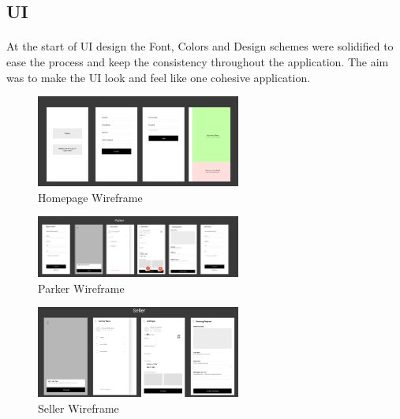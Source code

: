                 \subsection{UI}
                \paragraph*{}
                    At the start of UI design the Font, Colors and Design schemes were solidified to ease the process and keep the consistency throughout the application. The aim was to make the UI look and feel like one cohesive application.

                    \begin{figure}[h]
                        \centering
                        \includegraphics[width=0.6\textwidth]{images/homepageWireframe.png}
                        \caption{Homepage Wireframe}
                        \label{fig:homepageWireframe}
                    \end{figure}
    
                    \begin{figure}[h]
                        \centering
                        \includegraphics[width=0.6\textwidth]{images/parkerWireframe.png}
                        \caption{Parker Wireframe}
                        \label{fig:parkerWireframe}
                    \end{figure}

                    \begin{figure}[h]
                        \centering
                        \includegraphics[width=0.6\textwidth]{images/sellerWireframe.png}
                        \caption{Seller Wireframe}
                        \label{fig:sellerWireframe}
                    \end{figure}

